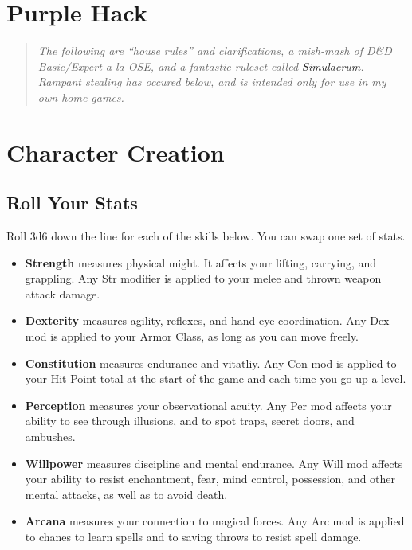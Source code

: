 \documentclass{article}
\begin{document}
\begin{multicols}{2}

\section{Purple Hack}\label{purple-hack}

\begin{quote}
\emph{The following are ``house rules'' and clarifications, a mish-mash
of D\&D Basic/Expert a la OSE, and a fantastic ruleset called
\href{https://osrsimulacrum.blogspot.com/2021/06/simulacrum-beta-release.html}{Simulacrum}.
Rampant stealing has occured below, and is intended only for use in my
own home games.}
\end{quote}

\section{Character Creation}\label{character-creation}

\subsection{Roll Your Stats}\label{roll-your-stats}

Roll 3d6 down the line for each of the skills below. You can swap one
set of stats.

\begin{itemize}
\tightlist
\item
  \textbf{Strength} measures physical might. It affects your lifting,
  carrying, and grappling. Any Str modifier is applied to your melee and
  thrown weapon attack damage.
\item
  \textbf{Dexterity} measures agility, reflexes, and hand-eye
  coordination. Any Dex mod is applied to your Armor Class, as long as
  you can move freely.
\item
  \textbf{Constitution} measures endurance and vitatliy. Any Con mod is
  applied to your Hit Point total at the start of the game and each time
  you go up a level.
\item
  \textbf{Perception} measures your observational acuity. Any Per mod
  affects your ability to see through illusions, and to spot traps,
  secret doors, and ambushes.
\item
  \textbf{Willpower} measures discipline and mental endurance. Any Will
  mod affects your ability to resist enchantment, fear, mind control,
  possession, and other mental attacks, as well as to avoid death.
\item
  \textbf{Arcana} measures your connection to magical forces. Any Arc
  mod is applied to chanes to learn spells and to saving throws to
  resist spell damage.
\end{itemize}


\end{multicols}
\end{document}
